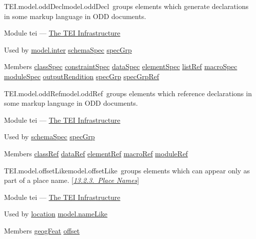 \begin{reflist}
\item[]\begin{specHead}{TEI.model.oddDecl}{model.oddDecl} groups elements which generate declarations in some markup language in ODD documents.\end{specHead} 
    \item[{Module}]
  tei — \hyperref[ST]{The TEI Infrastructure}
    \item[{Used by}]
  \hyperref[TEI.model.inter]{model.inter} \hyperref[TEI.schemaSpec]{schemaSpec} \hyperref[TEI.specGrp]{specGrp}
    \item[{Members}]
  \hyperref[TEI.classSpec]{classSpec} \hyperref[TEI.constraintSpec]{constraintSpec} \hyperref[TEI.dataSpec]{dataSpec} \hyperref[TEI.elementSpec]{elementSpec} \hyperref[TEI.listRef]{listRef} \hyperref[TEI.macroSpec]{macroSpec} \hyperref[TEI.moduleSpec]{moduleSpec} \hyperref[TEI.outputRendition]{outputRendition} \hyperref[TEI.specGrp]{specGrp} \hyperref[TEI.specGrpRef]{specGrpRef}
\end{reflist}  
\begin{reflist}
\item[]\begin{specHead}{TEI.model.oddRef}{model.oddRef} groups elements which reference declarations in some markup language in ODD documents.\end{specHead} 
    \item[{Module}]
  tei — \hyperref[ST]{The TEI Infrastructure}
    \item[{Used by}]
  \hyperref[TEI.schemaSpec]{schemaSpec} \hyperref[TEI.specGrp]{specGrp}
    \item[{Members}]
  \hyperref[TEI.classRef]{classRef} \hyperref[TEI.dataRef]{dataRef} \hyperref[TEI.elementRef]{elementRef} \hyperref[TEI.macroRef]{macroRef} \hyperref[TEI.moduleRef]{moduleRef}
\end{reflist}  
\begin{reflist}
\item[]\begin{specHead}{TEI.model.offsetLike}{model.offsetLike} groups elements which can appear only as part of a place name. [\textit{\hyperref[NDPLAC]{13.2.3.\ Place Names}}]\end{specHead} 
    \item[{Module}]
  tei — \hyperref[ST]{The TEI Infrastructure}
    \item[{Used by}]
  \hyperref[TEI.location]{location} \hyperref[TEI.model.nameLike]{model.nameLike}
    \item[{Members}]
  \hyperref[TEI.geogFeat]{geogFeat} \hyperref[TEI.offset]{offset}
\end{reflist}  
